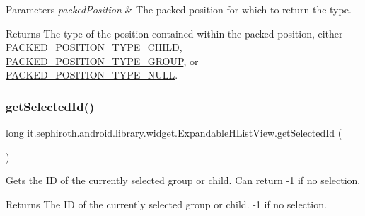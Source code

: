 \begin{DoxyParams}{Parameters}
{\em packed\+Position} & The packed position for which to return the type. \\
\hline
\end{DoxyParams}
\begin{DoxyReturn}{Returns}
The type of the position contained within the packed position, either \hyperlink{classit_1_1sephiroth_1_1android_1_1library_1_1widget_1_1_expandable_h_list_view_afbbb060d5013f38b6aef1c2f69e14524}{P\+A\+C\+K\+E\+D\+\_\+\+P\+O\+S\+I\+T\+I\+O\+N\+\_\+\+T\+Y\+P\+E\+\_\+\+C\+H\+I\+LD}, \hyperlink{classit_1_1sephiroth_1_1android_1_1library_1_1widget_1_1_expandable_h_list_view_adf5d28b1cc2f760523bbfc9aeb69d453}{P\+A\+C\+K\+E\+D\+\_\+\+P\+O\+S\+I\+T\+I\+O\+N\+\_\+\+T\+Y\+P\+E\+\_\+\+G\+R\+O\+UP}, or \hyperlink{classit_1_1sephiroth_1_1android_1_1library_1_1widget_1_1_expandable_h_list_view_a78d71758dda75d71811671cc7f176152}{P\+A\+C\+K\+E\+D\+\_\+\+P\+O\+S\+I\+T\+I\+O\+N\+\_\+\+T\+Y\+P\+E\+\_\+\+N\+U\+LL}. 
\end{DoxyReturn}
\mbox{\label{classit_1_1sephiroth_1_1android_1_1library_1_1widget_1_1_expandable_h_list_view_abfd35f491dbff714972b796f79caa0d6}} 
\subsubsection{\texorpdfstring{get\+Selected\+Id()}{getSelectedId()}}
{\footnotesize\ttfamily long it.\+sephiroth.\+android.\+library.\+widget.\+Expandable\+H\+List\+View.\+get\+Selected\+Id (\begin{DoxyParamCaption}{ }\end{DoxyParamCaption})}

Gets the ID of the currently selected group or child. Can return -\/1 if no selection.

\begin{DoxyReturn}{Returns}
The ID of the currently selected group or child. -\/1 if no selection. 
\end{DoxyReturn}
\mbox{\label{classit_1_1sephiroth_1_1android_1_1library_1_1widget_1_1_expandable_h_list_view_afc30e11177c063c70ea97f497a35c314}} 
